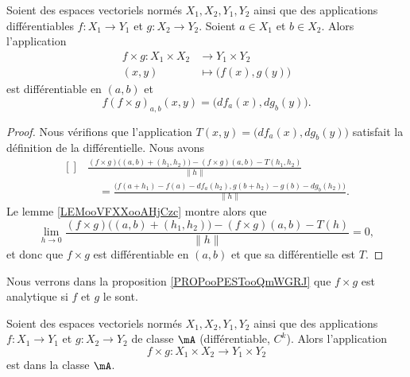\begin{lemma}	\label{LEMooAAYVooJZyRTq}
	Soient des espaces vectoriels normés \( X_1, X_2,Y_1,Y_2\) ainsi que des applications différentiables \(f \colon X_1\to Y_1  \) et \(g \colon X_2\to Y_2  \). Soient \( a\in X_1\) et \( b\in X_2\). Alors l'application
	\begin{equation}
		\begin{aligned}
			f\times g\colon X_1\times X_2 & \to Y_1\times Y_2              \\
			(x,y)                         & \mapsto \big( f(x), g(y) \big)
		\end{aligned}
	\end{equation}
	est différentiable en \( (a,b)\) et
	\begin{equation}
		f(f\times g)_{a,b}(x,y)=\big( df_a(x), dg_b(y) \big).
	\end{equation}
\end{lemma}

\begin{proof}
	Nous vérifions que l'application \( T(x,y)=\big( df_a(x), dg_b(y) \big)\) satisfait la définition de la différentielle. Nous avons
	\begin{equation}
		\begin{aligned}[]
			 & \frac{ (f\times g)\big( (a,b)+(h_1,h_2) \big)-(f\times g)(a,b)-T(h_1,h_2) }{ \| h \| } \\
			 & \quad=\frac{ \Big( f(a+h_1)-f(a)-df_a(h_2),g(b+h_2)-g(b)-dg_b(h_2) \Big) }{ \| h \| }.
		\end{aligned}
	\end{equation}
	Le lemme \ref{LEMooVFXXooAHjCzc} montre alors que
	\begin{equation}
		\lim_{h\to 0}\frac{ (f\times g)\big( (a,b)+(h_1,h_2) \big)-(f\times g)(a,b)-T(h) }{ \| h \| }=0,
	\end{equation}
	et donc que \( f\times g\) est différentiable en \( (a,b)\) et que sa différentielle est \( T\).
\end{proof}

Nous verrons dans la proposition \ref{PROPooPESTooQmWGRJ} que \( f\times g\) est analytique si \( f\) et \( g\) le sont.


\begin{proposition}	\label{PROPooCOBHooICFDMU}
	Soient des espaces vectoriels normés \( X_1, X_2,Y_1,Y_2\) ainsi que des applications \(f \colon X_1\to Y_1  \) et \(g \colon X_2\to Y_2  \) de classe \( \mA\) (différentiable, \( C^k\)). Alors l'application
	\begin{equation}
		f\times g \colon X_1\times X_2\to Y_1\times Y_2
	\end{equation}
	est dans la classe \( \mA\).
\end{proposition}

